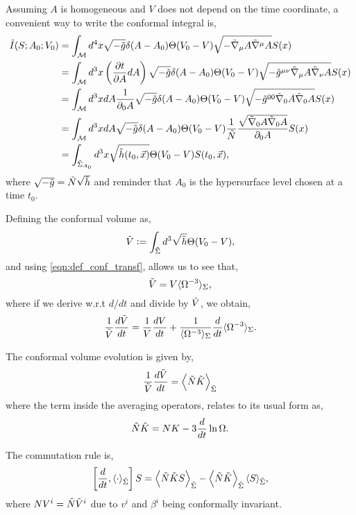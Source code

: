Assuming $A$ is homogeneous and $V$ does not depend on the time coordinate, a convenient way to write the conformal integral is,
\begin{align}
    \Tilde{I}(S;A_0;V_0) &= \int_{\mathcal{M}}d^4x \sqrt{-\Tilde{g}} \delta(A-A_0)\Theta(V_0-V)\sqrt{-\Tilde{\nabla}_\mu A\Tilde{\nabla}^\mu A}S(x)\nonumber\\
    &= \int_{\mathcal{M}}d^3x \left(\frac{\partial t}{\partial A}dA\right) \sqrt{-\Tilde{g}} \delta(A-A_0)\Theta(V_0-V)\sqrt{-\Tilde{g}^{\mu\nu}\Tilde{\nabla}_\mu A\Tilde{\nabla}_\nu A}S(x)\nonumber\\
    &= \int_{\mathcal{M}}d^3x dA \frac{1}{\partial_0 A}\sqrt{-\Tilde{g}} \delta(A-A_0)\Theta(V_0-V)\sqrt{-\Tilde{g}^{00}\Tilde{\nabla}_0 A\Tilde{\nabla}_0 A}S(x)\nonumber\\
    &= \int_{\mathcal{M}}d^3x dA \sqrt{-\Tilde{g}} \delta(A-A_0)\Theta(V_0-V)\frac{1}{\Tilde{N}}\frac{\sqrt{\Tilde{\nabla}_0 A\Tilde{\nabla}_0 A}}{\partial_0 A}S(x)\nonumber\\
    &= \int_{\Tilde{\Sigma}_{A_0}}d^3x \sqrt{\Tilde{h}(t_0,\vec{x})}\Theta(V_0-V)S(t_0,\vec{x}),
\end{align}
where $\sqrt{-\Tilde{g}}=\Tilde{N}\sqrt{\Tilde{h}}$ and reminder that $A_0$ is the hypersurface level chosen at a time $t_0$.

Defining the conformal volume as,
\begin{equation}
    \Tilde{V}:=\int_{\Tilde{\Sigma}}d^3\sqrt{\Tilde{h}}\Theta(V_0-V),
\end{equation}
and using \cref{eqn:def_conf_transf}, allows us to see that,
\begin{equation}
    \Tilde{V}=V\langle\Omega^{-3}\rangle_\Sigma,
\end{equation}
where if we derive w.r.t $d/dt$ and divide by $\Tilde{V}$, we obtain,
\begin{equation}
    \frac{1}{\Tilde{V}}\frac{d\Tilde{V}}{dt}=\frac{1}{V}\frac{dV}{dt}+\frac{1}{\langle\Omega^{-3}\rangle_\Sigma}\frac{d}{dt}\langle\Omega^{-3}\rangle_\Sigma.
\end{equation}

The conformal volume evolution is given by,
\begin{equation}
    \frac{1}{\Tilde{V}}\frac{d\Tilde{V}}{dt}=\left\langle \Tilde{N}\Tilde{K}\right\rangle_{\Tilde{\Sigma}}
    \label{eqn:LCA_conf_volume_evo}
\end{equation}
where the term inside the averaging operators, relates to its usual form as,
\begin{equation}
    \Tilde{N}\Tilde{K}=NK-3\frac{d}{dt}\ln\Omega.
    \label{eqn:LCA__relation_general_inside_term}
\end{equation}




The commutation rule is,
\begin{equation}
    \left[\frac{d}{dt},\langle\cdot\rangle_{\Tilde{\Sigma}}\right]S=\left\langle \Tilde{N}\Tilde{K}S\right\rangle_{\Tilde{\Sigma}}-\left\langle \Tilde{N}\Tilde{K}\right\rangle_{\Tilde{\Sigma}}\langle S\rangle_{\Tilde{\Sigma}},
\end{equation}
where $NV^i=\Tilde{N}\Tilde{V}^i$ due to $v^i$ and $\beta^i$ being conformally invariant.


